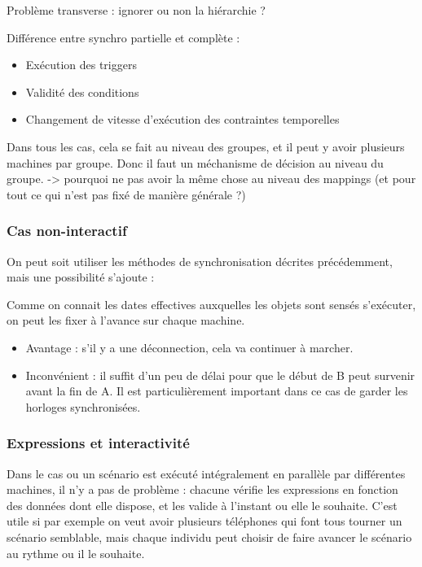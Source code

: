\documentclass{article}
\begin{document}
Problème transverse : ignorer ou non la hiérarchie ? 

Différence entre synchro partielle et complète : 
\begin{itemize}
    \item Exécution des triggers
    \item Validité des conditions
    \item Changement de vitesse d'exécution des contraintes temporelles
\end{itemize}

Dans tous les cas, cela se fait au niveau des groupes, et il peut y avoir plusieurs machines par groupe.
Donc il faut un méchanisme de décision au niveau du groupe.
-> pourquoi ne pas avoir la même chose au niveau des mappings (et pour tout ce qui n'est pas fixé de manière générale ?)

\subsubsection{Cas non-interactif}
On peut soit utiliser les méthodes de synchronisation décrites précédemment, mais une possibilité s'ajoute : 

Comme on connait les dates effectives auxquelles les objets sont sensés s'exécuter, on peut les fixer à l'avance sur chaque machine. 

\begin{itemize}
\item Avantage : s'il y a une déconnection, cela va continuer à marcher.
\item Inconvénient : il suffit d'un peu de délai pour que le début de B peut survenir avant la fin de A. 
Il est particulièrement important dans ce cas de garder les horloges synchronisées.
\end{itemize}

\subsubsection{Expressions et interactivité}
Dans le cas ou un scénario est exécuté intégralement en parallèle par différentes machines, il n'y a pas de problème : chacune vérifie les expressions en fonction des données dont elle dispose, et les valide à l'instant ou elle le souhaite. C'est utile si par exemple on veut avoir plusieurs téléphones qui font tous tourner un scénario semblable, mais chaque individu peut choisir de faire avancer le scénario au rythme ou il le souhaite.
\end{document}
